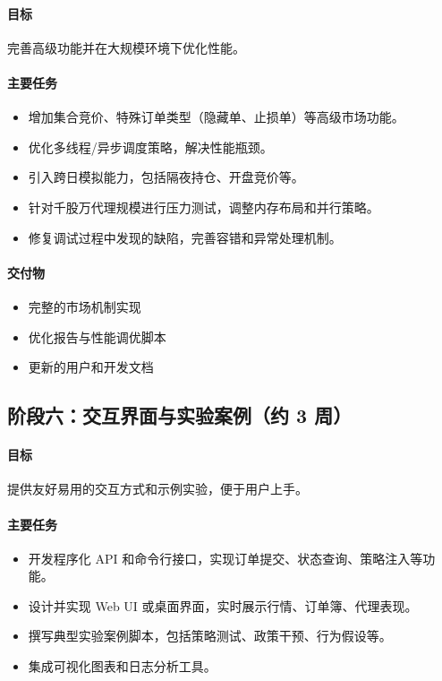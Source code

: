 \paragraph{目标} 完善高级功能并在大规模环境下优化性能。

\paragraph{主要任务}
\begin{itemize}
  \item 增加集合竞价、特殊订单类型（隐藏单、止损单）等高级市场功能。
  \item 优化多线程/异步调度策略，解决性能瓶颈。
  \item 引入跨日模拟能力，包括隔夜持仓、开盘竞价等。
  \item 针对千股万代理规模进行压力测试，调整内存布局和并行策略。
  \item 修复调试过程中发现的缺陷，完善容错和异常处理机制。
\end{itemize}

\paragraph{交付物}
\begin{itemize}
  \item 完整的市场机制实现
  \item 优化报告与性能调优脚本
  \item 更新的用户和开发文档
\end{itemize}

\subsection{阶段六：交互界面与实验案例（约 3 周）}

\paragraph{目标} 提供友好易用的交互方式和示例实验，便于用户上手。

\paragraph{主要任务}
\begin{itemize}
  \item 开发程序化 API 和命令行接口，实现订单提交、状态查询、策略注入等功能。
  \item 设计并实现 Web UI 或桌面界面，实时展示行情、订单簿、代理表现。
  \item 撰写典型实验案例脚本，包括策略测试、政策干预、行为假设等。
  \item 集成可视化图表和日志分析工具。
\end{itemize}


